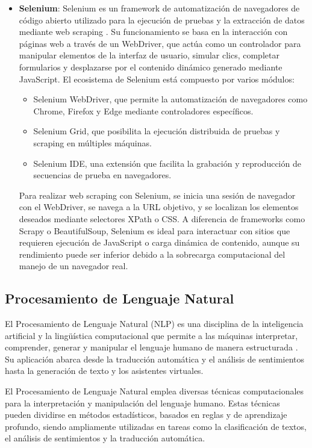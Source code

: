\begin{itemize}
    \item \textbf{Selenium}: Selenium es un framework de automatización de navegadores de código abierto utilizado para la ejecución de pruebas y la extracción de datos mediante web scraping \cite{9142938}. 
    Su funcionamiento se basa en la interacción con páginas web a través de un WebDriver, que actúa como un controlador para manipular elementos de la interfaz de usuario, simular clics, completar formularios y desplazarse por el contenido dinámico generado mediante JavaScript.
    El ecosistema de Selenium está compuesto por varios módulos:

    \begin{itemize}
        \item Selenium WebDriver, que permite la automatización de navegadores como Chrome, Firefox y Edge mediante controladores específicos.
        \item Selenium Grid, que posibilita la ejecución distribuida de pruebas y scraping en múltiples máquinas.
        \item Selenium IDE, una extensión que facilita la grabación y reproducción de secuencias de prueba en navegadores.
    \end{itemize}

    Para realizar web scraping con Selenium, se inicia una sesión de navegador con el WebDriver, se navega a la URL objetivo, y se localizan los elementos deseados mediante selectores XPath o CSS. A diferencia de frameworks como Scrapy o BeautifulSoup, Selenium es ideal para interactuar con sitios que requieren ejecución de JavaScript o carga dinámica de contenido, aunque su rendimiento puede ser inferior debido a la sobrecarga computacional del manejo de un navegador real.

\end{itemize}

\subsection{Procesamiento de Lenguaje Natural}

El Procesamiento de Lenguaje Natural (NLP) es una disciplina de la inteligencia artificial y la lingüística computacional que permite a las máquinas interpretar, comprender, generar y manipular el lenguaje humano de manera estructurada \cite{nlpstate}. 
Su aplicación abarca desde la traducción automática y el análisis de sentimientos hasta la generación de texto y los asistentes virtuales.

El Procesamiento de Lenguaje Natural emplea diversas técnicas computacionales para la interpretación y manipulación del lenguaje humano. 
Estas técnicas pueden dividirse en métodos estadísticos, basados en reglas y de aprendizaje profundo, siendo ampliamente utilizadas en tareas como la clasificación de textos, el análisis de sentimientos y la traducción automática.

